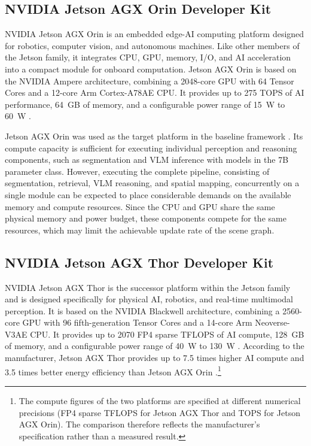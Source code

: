 {{{}

\subsection{NVIDIA Jetson AGX Orin Developer Kit}

{\small

NVIDIA Jetson AGX Orin is an embedded edge-AI computing platform designed for robotics, computer vision, and autonomous machines. Like other members of the Jetson family, it integrates CPU, GPU, memory, I/O, and AI acceleration into a compact module for onboard computation. Jetson AGX Orin is based on the NVIDIA Ampere architecture, combining a 2048-core GPU with 64 Tensor Cores and a 12-core Arm Cortex-A78AE CPU. It provides up to 275 TOPS of AI performance, 64~GB of memory, and a configurable power range of 15~W to 60~W \cite{nvidia_jetson_orin}.

Jetson AGX Orin was used as the target platform in the baseline framework \cite{schiel2026online}. Its compute capacity is sufficient for executing individual perception and reasoning components, such as segmentation and VLM inference with models in the 7B parameter class. However, executing the complete pipeline, consisting of segmentation, retrieval, VLM reasoning, and spatial mapping, concurrently on a single module can be expected to place considerable demands on the available memory and compute resources. Since the CPU and GPU share the same physical memory and power budget, these components compete for the same resources, which may limit the achievable update rate of the scene graph.

}

\subsection{NVIDIA Jetson AGX Thor Developer Kit}

{\small

NVIDIA Jetson AGX Thor is the successor platform within the Jetson family and is designed specifically for physical AI, robotics, and real-time multimodal perception. It is based on the NVIDIA Blackwell architecture, combining a 2560-core GPU with 96 fifth-generation Tensor Cores and a 14-core Arm Neoverse-V3AE CPU. It provides up to 2070 FP4 sparse TFLOPS of AI compute, 128~GB of memory, and a configurable power range of 40~W to 130~W \cite{nvidia_jetson_thor}. According to the manufacturer, Jetson AGX Thor provides up to 7.5 times higher AI compute and 3.5 times better energy efficiency than Jetson AGX Orin \cite{nvidia_jetson_thor}.\footnote{The compute figures of the two platforms are specified at different numerical precisions (FP4 sparse TFLOPS for Jetson AGX Thor and TOPS for Jetson AGX Orin). The comparison therefore reflects the manufacturer's specification rather than a measured result.}

}}}
